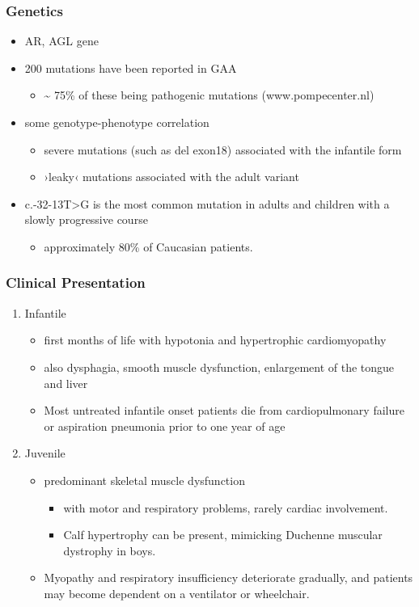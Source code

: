 \documentclass{scrartcl}
\begin{document}
\subsubsection{Genetics}
\label{sec:org85e98bf}
\begin{itemize}
\item AR, AGL gene
\item 200 mutations have been reported in GAA
\begin{itemize}
\item \textasciitilde{} 75\% of these being pathogenic mutations (www.pompecenter.nl)
\end{itemize}
\item some genotype-phenotype correlation
\begin{itemize}
\item severe mutations (such as del exon18) associated with the infantile form
\item ›leaky‹ mutations associated with the adult variant
\end{itemize}
\item c.-32-13T>G is the most common mutation in adults and children with
a slowly progressive course
\begin{itemize}
\item approximately 80\% of Caucasian patients.
\end{itemize}
\end{itemize}

\subsubsection{Clinical Presentation}
\label{sec:orgc93c4d9}
\begin{enumerate}
\item Infantile
\label{sec:org2a64b17}
\begin{itemize}
\item first months of life with hypotonia and hypertrophic cardiomyopathy
\item also dysphagia, smooth muscle dysfunction, enlargement of the tongue
and liver
\item Most untreated infantile onset patients die from cardiopulmonary
failure or aspiration pneumonia prior to one year of age
\end{itemize}
\item Juvenile
\label{sec:org5e57d6e}
\begin{itemize}
\item predominant skeletal muscle dysfunction
\begin{itemize}
\item with motor and respiratory problems, rarely cardiac involvement.
\item Calf hypertrophy can be present, mimicking Duchenne muscular dystrophy in boys.
\end{itemize}
\item Myopathy and respiratory insufficiency deteriorate gradually, and patients may become dependent on a ventilator or wheelchair.
\end{itemize}
\end{enumerate}
\end{document}
